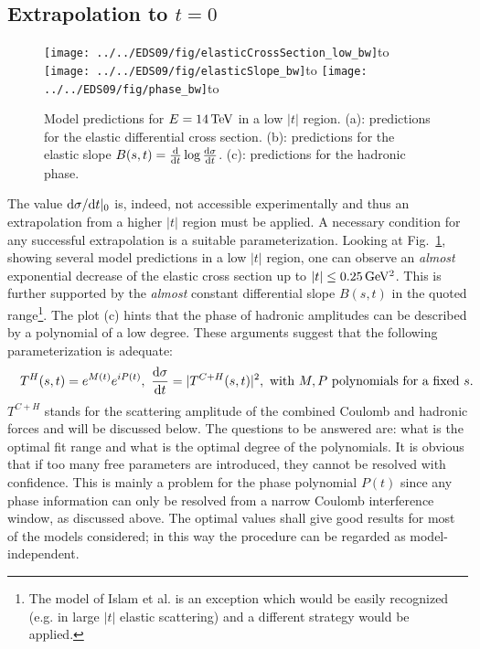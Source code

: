 \documentclass{cimento}
\def\si{\sigma}
\def\un#1{\,{\rm #1}}
\def\subtitle#1#2{\vbox{\setbox0\hbox{#1}\copy0\hbox to\wd0{\hss#2\hss}}}
\def\d{{\rm d}}
\begin{document}

\subsection{Extrapolation to $t = 0$}\label{sec:extrapolation}

\begin{figure}[htb]
\centerline{\hss
	\subtitle{\texttt{[image: ../../EDS09/fig/elasticCrossSection\_low\_bw]}}{(a)}\hfil
	\subtitle{\texttt{[image: ../../EDS09/fig/elasticSlope\_bw]}}{(b)}\hss
	\subtitle{\texttt{[image: ../../EDS09/fig/phase\_bw]}}{(c)}\hss
}%
\caption{Model predictions for $E=14\un{TeV}$ in a low $|t|$ region. (a): predictions for the elastic differential cross section. (b): predictions for the elastic slope $B(s, t) = {\d\over\d t} \log {\d\si\over\d t}$. (c): predictions for the hadronic phase.}%
\label{fig:models low}%
\end{figure}


The value $\d\si/\d t|_0$ is, indeed, not accessible experimentally and thus an extrapolation from a higher $|t|$ region must be applied. A necessary condition for any successful extrapolation is a suitable parameterization. Looking at Fig.~\ref{fig:models low}, showing several model predictions in a low $|t|$ region, one can observe an {\em almost} exponential decrease of the elastic cross section up to $|t| \leq 0.25\un{GeV^2}$. This is further supported by the {\em almost} constant differential slope $B(s, t)$ in the quoted range\footnote{\label{fn:islam}
The model of Islam et al. is an exception which would be easily recognized (e.g. in large $|t|$ elastic scattering) and a different strategy would be applied.
}. The plot (c) hints that the phase of hadronic amplitudes can be described by a polynomial of a low degree. These arguments suggest that the following parameterization is adequate:
\begin{equation}
T^H(s, t) = e^{M(t)} e^{i P(t)},\ {\d\si\over\d t} = |T^{C+H}(s, t)|^2,\ \hbox{with }M, P\hbox{ polynomials for a fixed }s.\hskip-5mm
\label{eq:param}
\end{equation}
$T^{C+H}$ stands for the scattering amplitude of the combined Coulomb and hadronic forces and will be discussed below. The questions to be answered are: what is the optimal fit range and what is the optimal degree of the polynomials. It is obvious that if too many free parameters are introduced, they cannot be resolved with confidence. This is mainly a problem for the phase polynomial $P(t)$ since any phase information can only be resolved from a narrow Coulomb interference window, as discussed above. The optimal values shall give good results for most of the models considered; in this way the procedure can be regarded as model-independent.
\end{document}
